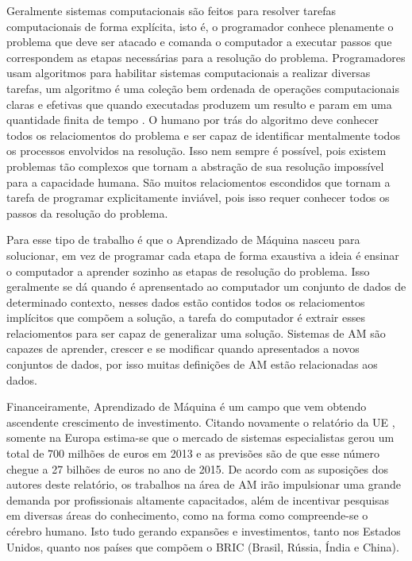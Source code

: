 Geralmente sistemas computacionais são feitos para resolver tarefas computacionais de forma explícita, isto é, o programador conhece plenamente o problema que deve ser atacado e comanda o computador a executar passos que correspondem as etapas necessárias para a resolução do problema. Programadores usam algoritmos para habilitar sistemas computacionais a realizar diversas tarefas, um algoritmo é uma coleção bem ordenada de operações computacionais claras e efetivas que quando executadas produzem um resulto e param em uma quantidade finita de tempo \cite{schn1995}. O humano por trás do algoritmo deve conhecer todos os relaciomentos do problema e ser capaz de identificar mentalmente todos os processos envolvidos na resolução. Isso nem sempre é possível, pois existem problemas tão complexos que tornam a abstração de sua resolução impossível para a capacidade humana. São muitos relaciomentos escondidos que tornam a tarefa de programar explicitamente inviável, pois isso requer conhecer todos os passos da resolução do problema.

Para esse tipo de trabalho é que o Aprendizado de Máquina nasceu para solucionar, em vez de programar cada etapa de forma exaustiva a ideia é ensinar o computador a aprender sozinho as etapas de resolução do problema. Isso geralmente se dá quando é aprensentado ao computador um conjunto de dados de determinado contexto, nesses dados estão contidos todos os relaciomentos implícitos que compõem a solução, a tarefa do computador é extrair esses relaciomentos para ser capaz de generalizar uma solução. Sistemas de AM são capazes de aprender, crescer e se modificar quando apresentados a novos conjuntos de dados, por isso muitas definições de AM estão relacionadas aos dados.

Financeiramente, Aprendizado de Máquina é um campo que vem obtendo ascendente crescimento de investimento. Citando novamente o relatório da UE \cite{eu2013}, somente na Europa estima-se que o mercado de sistemas especialistas gerou um total de 700 milhões de euros em 2013 e as previsões são de que esse número chegue a 27 bilhões de euros no ano de 2015. De acordo com as suposições dos autores deste relatório, os trabalhos na área de AM irão impulsionar uma grande demanda por profissionais altamente capacitados, além de incentivar pesquisas em diversas áreas do conhecimento, como na forma como compreende-se o cérebro humano. Isto tudo gerando expansões e investimentos, tanto nos Estados Unidos, quanto nos países que compõem o BRIC (Brasil, Rússia, Índia e China). 

